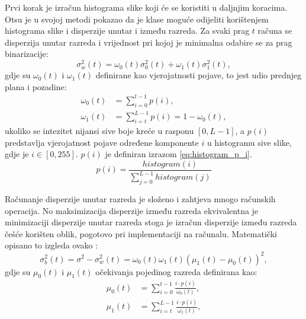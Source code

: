 Prvi korak je izračun histograma slike koji će se koristiti u daljnjim koracima. Otsu je u svojoj metodi pokazao da je klase moguće odijeliti korištenjem histograma slike i disperzije unutar i između razreda. Za svaki prag $t$ računa se disperzija unutar razreda i vrijednost pri kojoj je minimalna odabire se za prag binarizacije:
\begin{equation} \label{eq:within_class}
    \sigma_w^2(t) = \omega_0(t)\sigma_0^2(t) + \omega_1(t)\sigma_1^2(t),
\end{equation}
gdje su $\omega_0(t)$ i $\omega_1(t)$ definirane kao vjerojatnosti pojave, to jest udio prednjeg plana i pozadine:
\begin{align}
    \omega_0(t)&=\sum_{i=0}^{t-1}p(i), \label{eq:background} \\
    \omega_1(t)&=\sum_{i=t}^{L-1}p(i)=1-\omega_0(t), \label{eq:foreground}
\end{align}
ukoliko se intezitet nijansi sive boje kreće u rasponu $[0, L-1]$, a $p(i)$ predstavlja vjerojatnost pojave određene komponente $i$ u histogramu sive slike, gdje je $i \in [0, 255]$. $p(i)$ je definiran izrazom \eqref{eq:histogram_p_i}.
\begin{equation} \label{eq:histogram_p_i}
    p(i) = \dfrac{histogram(i)}{\sum_{j=0}^{L-1}histogram(j)}
\end{equation}

Računanje disperzije unutar razreda je složeno i zahtjeva mnogo računskih operacija. No maksimizacija disperzije između razreda ekvivalentna je minimizaciji disperzije unutar razreda stoga je izračun disperzije između razreda češće korišten oblik, pogotovo pri implementaciji na računalu. Matematički opisano to izgleda ovako \citep{1979:ots}:
\begin{equation} \label{eq:between_class}
    \sigma_b^2(t) = \sigma^2 - \sigma_w^2(t) = \omega_0(t)\omega_1(t)(\mu_1(t) - \mu_0(t))^2,
\end{equation}
gdje su $\mu_0(t)$ i $\mu_1(t)$ očekivanja pojedinog razreda definirana kao:
\begin{align}
    \mu_0(t)&=\sum_{i=0}^{t-1}\frac{i\cdot p(i)}{\omega_0(t)}, \label{eq:mean_bg} \\
    \mu_1(t)&=\sum_{i=t}^{L-1}\frac{i\cdot p(i)}{\omega_1(t)}, \label{eq:mean_fg}
\end{align}

